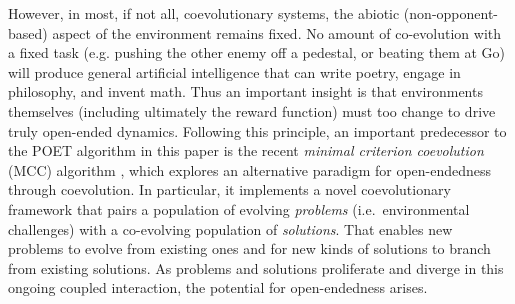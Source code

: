 \documentclass{article}
\newcommand{\jc}[1]{\comments{\textcolor{deepForestGreen}{[JC: #1]}}}
\newcommand{\ks}[1]{\comments{\textcolor{purple}{[Ken: #1]}}}
\newcommand{\rw}[1]{\comments{\textcolor{blue}{[Rui: #1]}}}
\newcommand{\comments}[1]{#1}
\begin{document}

However, in most, if not all, coevolutionary systems, the abiotic (non-opponent-based) aspect of the environment remains fixed. No amount of co-evolution with a fixed task (e.g. pushing the other enemy off a pedestal, or beating them at Go) will produce general artificial intelligence that can write poetry, engage in philosophy, and invent math. 
Thus an important insight is that environments themselves (including ultimately the reward function) must too change to drive truly open-ended dynamics. 
Following this principle, an important predecessor to the POET algorithm in this paper is the recent \emph{minimal criterion coevolution} (MCC) 
algorithm \cite{brant:mcc17}, which explores an alternative paradigm for open-endedness through coevolution. In particular, it implements a novel coevolutionary framework that pairs a population of evolving \emph{problems} (i.e.\ environmental challenges) with a co-evolving population of \emph {solutions}.  
That enables new problems to evolve from existing ones and for new kinds of solutions to branch from existing solutions.  As problems and solutions proliferate and diverge in this ongoing coupled interaction, the potential for open-endedness arises.
\end{document}
